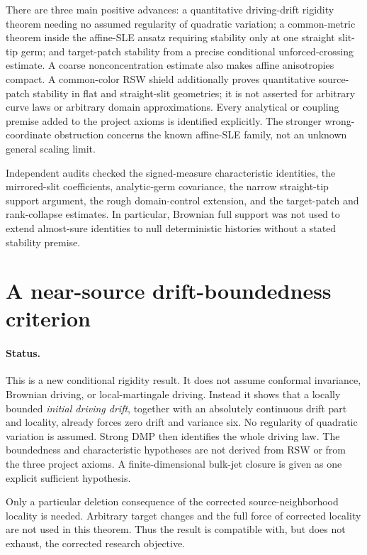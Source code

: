\documentclass[11pt]{article}
\theoremstyle{definition}\newtheorem{definition}[theorem]{Definition}
\theoremstyle{remark}\newtheorem{remark}[theorem]{Remark}
\begin{document}
There are three main positive advances: a quantitative driving-drift
rigidity theorem needing no assumed regularity of quadratic variation;
a common-metric theorem inside the affine-SLE ansatz requiring stability
only at one straight slit-tip germ; and target-patch stability from a precise
conditional unforced-crossing estimate. A coarse nonconcentration estimate also makes affine anisotropies compact. A common-color RSW shield additionally proves quantitative source-patch stability in flat and straight-slit geometries; it is not asserted for arbitrary curve laws or arbitrary domain approximations. Every analytical or coupling
premise added to the project axioms is identified explicitly. The stronger
wrong-coordinate obstruction concerns the known affine-SLE family, not an
unknown general scaling limit.

Independent audits checked the signed-measure characteristic identities,
the mirrored-slit coefficients, analytic-germ covariance, the narrow
straight-tip support argument, the rough domain-control extension, and
the target-patch and rank-collapse estimates. In particular, Brownian full
support was not used to extend almost-sure identities to null deterministic
histories without a stated stability premise.
\section{A near-source drift-boundedness criterion}
\label{sec:strong-local-loewner}

\paragraph{Status.}
This is a new conditional rigidity result.  It does not assume conformal
invariance, Brownian driving, or local-martingale driving.  Instead it shows
that a locally bounded \emph{initial driving drift}, together with an
absolutely continuous drift part and locality, already forces zero drift and
variance six.  No regularity of quadratic variation is assumed.  Strong DMP then identifies the whole driving law.  The
boundedness and characteristic hypotheses are not derived from RSW or from
the three project axioms.  A finite-dimensional bulk-jet closure is given as
one explicit sufficient hypothesis.

Only a particular deletion consequence of the corrected source-neighborhood
locality is needed.  Arbitrary target changes and the full force of corrected
locality are not used in this theorem.  Thus the result is compatible with,
but does not exhaust, the corrected research objective.
\end{document}
